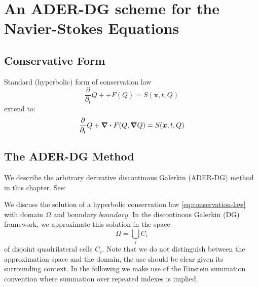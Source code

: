 \newcommand{\Qrho}{\rho}
\newcommand{\Qj}{\rho \bm{v}}
\newcommand{\Qv}{\bm{v}}
\newcommand{\QE}{\rho E}
\newcommand{\potT}{\theta}
\newcommand{\backgroundPotT}{\overline{\theta}}
\newcommand{\pertubationPotT}{\theta'}
\newcommand{\stressT}{\bm{\sigma}}
\newcommand{\pressure}{p}
\newcommand{\maxConvEigen}{\vert \lambda_c^{\text{max}} \vert}
\newcommand{\maxViscEigen}{\vert \lambda_v^{\text{max}} \vert}

\newcommand{\domain}{\Omega}
\newcommand{\broken}{\domain}
\newcommand{\cell}[1][i]{C_{#1}}
\newcommand{\boundary}{\partial \domain}
\newcommand{\sbasis}[1]{\Phi_{#1}}
\newcommand{\testfunction}[1]{\Phi_{#1}}

\chapter{An ADER-DG scheme for the Navier-Stokes Equations}
\section{Conservative Form}
Standard (hyperbolic) form of conservation law
\begin{equation}
  \label{eq:conservation-law}
 \frac{\partial}{\partial_t}  Q + \div F(Q) = S(\bm{x}, t, Q)
\end{equation}
extend to:
\begin{equation}
  \label{eq:conservation-law-gradient}
 \frac{\partial}{\partial_t}  Q + \div F(Q, \grad Q) = S(\bm{x}, t, Q)
\end{equation}

\section{The ADER-DG Method}
\label{sec:ader-dg}
We describe the arbitrary derivative discontinous Galerkin (ADER-DG) method in this chapter.
See: \cite{dumbser2018efficient}

We discuss the solution of a hyperbolic conservation law \cref{eq:conservation-law} with domain $\domain$ and boundary $boundary$.
In the discontinous Galerkin (DG) framework, we approximate this solution in the space
\begin{equation}
  \label{eq:dg-space}
  \broken = \bigcup_i \cell
\end{equation}
of disjoint quadrilateral cells $\cell$.
Note that we do not distinguish between the approximation space and the domain, the use should be clear given its surrounding context.
In the following we make use of the Einstein summation convention where summation over repeated indexes is implied.

